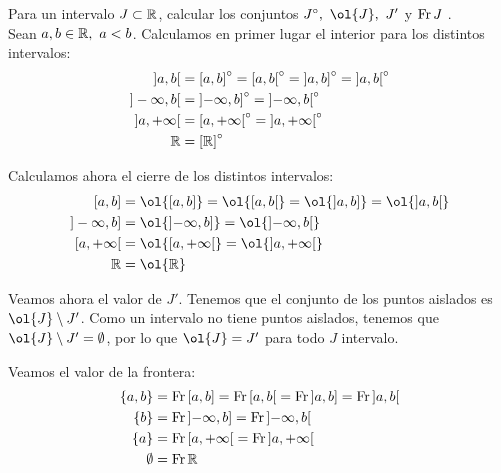 \begin{ejercicio}
    Para un intervalo $J \subset \mathbb{R}$, calcular los conjuntos $J^\circ,~\ol{J},~J'$ y $\operatorname{Fr} J$ .\\

    Sean $a,b\in \mathbb{R},~a<b$. Calculamos en primer lugar el interior para los distintos intervalos:
    \begin{equation*}\begin{split}
        ]a,b[ &= \left[a,b\right]^\circ = \left[a,b\right[^\circ= \left]a,b\right]^\circ= \left]a,b\right[^\circ \\
        ]-\infty, b[ &= \left]-\infty, b\right]^\circ = \left]-\infty,b \right[^\circ\\
        ]a, +\infty[ &= \left[a,+\infty\right[^\circ = \left]a,+\infty\right[^\circ \\
        \mathbb{R}&=\left[\mathbb{R}\right]^\circ
    \end{split}\end{equation*}


    Calculamos ahora el cierre de los distintos intervalos:
    \begin{equation*}\begin{split}
        [a,b] &= \ol{\left[a,b\right]} = \ol{\left[a,b\right[}= \ol{\left]a,b\right]}= \ol{\left]a,b\right[} \\
        ]-\infty, b] &= \ol{\left]-\infty, b\right]} = \ol{\left]-\infty,b \right[}\\
        [a, +\infty[ &= \ol{\left[a,+\infty\right[} = \ol{\left]a,+\infty\right[} \\
        \bb{R}&=\ol{\bb{R}}
    \end{split}\end{equation*}

    Veamos ahora el valor de $J'$. Tenemos que el conjunto de los puntos aislados es $\ol{J}\setminus J'$. Como un intervalo no tiene puntos aislados, tenemos que $\ol{J}\setminus J'=\emptyset$, por lo que $\ol{J}=J'$ para todo $J$ intervalo.
    
    Veamos el valor de la frontera:
    \begin{equation*}\begin{split}
        \{a,b\} &= \operatorname{Fr}{\left[a,b\right]} = \operatorname{Fr}{\left[a,b\right[}= \operatorname{Fr}{\left]a,b\right]}= \operatorname{Fr}{\left]a,b\right[} \\
        \{b\} &= \operatorname{Fr}{\left]-\infty, b\right]} = \operatorname{Fr}{\left]-\infty,b \right[}\\
        \{a\} &= \operatorname{Fr}{\left[a,+\infty\right[} = \operatorname{Fr}{\left]a,+\infty\right[} \\
        \emptyset&=\operatorname{Fr} \mathbb{R}
    \end{split}\end{equation*}
\end{ejercicio}

